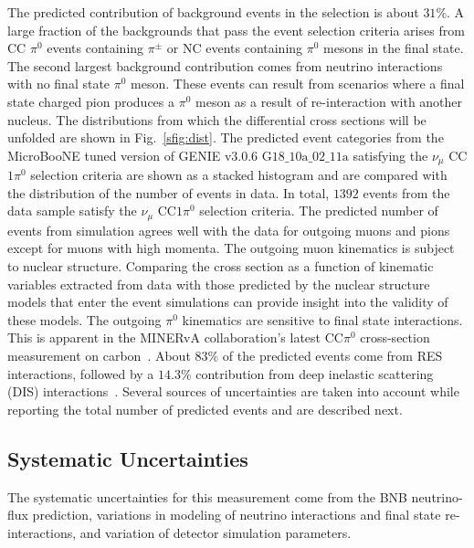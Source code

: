 \documentclass[%
 reprint,
 amsmath,amssymb, longbibliography,
 aps, 
 prd,
 twocolumn,
 showpacs,
 superscriptaddress
]{revtex4-2}
\begin{document}
The predicted contribution of background events in the selection is about $31$\%. A large fraction of the backgrounds that pass the event selection criteria arises from CC $\pi^0$ events containing $\pi^{\pm}$ or NC events containing $\pi^0$ mesons in the final state. The second largest background contribution comes from neutrino interactions with no final state $\pi^0$ meson. These events can result from scenarios where a final state charged pion produces a $\pi^0$ meson as a result of re-interaction with another nucleus. The distributions from which the differential cross sections will be unfolded are shown in Fig.~\ref{sfig:dist}. The predicted event categories from the MicroBooNE tuned version of GENIE $\text{v3.0.6}$ $\text{G18\_10a\_02\_11a}$ satisfying the $\nu_{\mu}$ CC$1\pi^0$ selection criteria are shown as a stacked histogram and are compared with the distribution of the number of events in data. In total, $1392$ events from the data sample satisfy the $\nu_{\mu}$ CC$1\pi^0$ selection criteria. The predicted number of events from simulation agrees well with the data for outgoing muons and pions except for muons with high momenta. The outgoing muon kinematics is subject to nuclear structure. Comparing the cross section as a function of kinematic variables extracted from data with those predicted by the nuclear structure models that enter the event simulations can provide insight into the validity of these models. The outgoing $\pi^0$ kinematics are sensitive to final state interactions. This is apparent in the MINERvA collaboration’s latest CC$\pi^0$ cross-section measurement on carbon~\cite{MINERvA:2020anu}. About $83$\% of the predicted events come from RES interactions, followed by a $14.3$\% contribution from deep inelastic scattering (DIS) interactions~\cite{supp_mat}. Several sources of uncertainties are taken into account while reporting the total number of predicted events and are described next. %
\subsection{Systematic Uncertainties\label{sys_unc}}
The systematic uncertainties for this measurement come from the BNB neutrino-flux prediction, variations in modeling of neutrino interactions and final state re-interactions, and variation of detector simulation parameters. 
\end{document}
